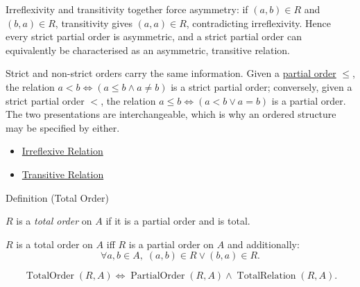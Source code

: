 \begin{remark*}[Exposition]
Irreflexivity and transitivity together force asymmetry: if $(a,b)\in R$ and
$(b,a)\in R$, transitivity gives $(a,a)\in R$, contradicting irreflexivity.
Hence every strict partial order is asymmetric, and a strict partial order can
equivalently be characterised as an asymmetric, transitive relation.
\end{remark*}

\begin{remark*}[Exposition]
Strict and non-strict orders carry the same information. Given a
\hyperref[def:partial-order]{partial order} $\leq$, the relation
$a < b \iff (a \leq b \wedge a \neq b)$ is a strict partial order; conversely,
given a strict partial order $<$, the relation
$a \leq b \iff (a < b \vee a = b)$ is a partial order. The two presentations
are interchangeable, which is why an ordered structure may be specified by
either.
\end{remark*}

\begin{dependencies}
\begin{itemize}
  \item \hyperref[def:irreflexive]{Irreflexive Relation}
  \item \hyperref[def:transitive]{Transitive Relation}
\end{itemize}
\end{dependencies}

\begin{definitionbox}{Definition (Total Order)}
\begin{definition}\label{def:total-order}
$R$ is a \emph{total order} on $A$ if it is a partial order and is total.
\end{definition}
\end{definitionbox}


\begin{remark*}
$R$ is a total order on $A$ iff $R$ is a partial order on $A$ and additionally:
\[
\forall a, b \in A,\; (a,b)\in R \vee (b,a)\in R.
\]
\end{remark*}

\begin{remark*}
\[
  \operatorname{TotalOrder}(R,A)
  \iff
  \operatorname{PartialOrder}(R,A)
  \wedge \operatorname{TotalRelation}(R,A).
\]
\end{remark*}

